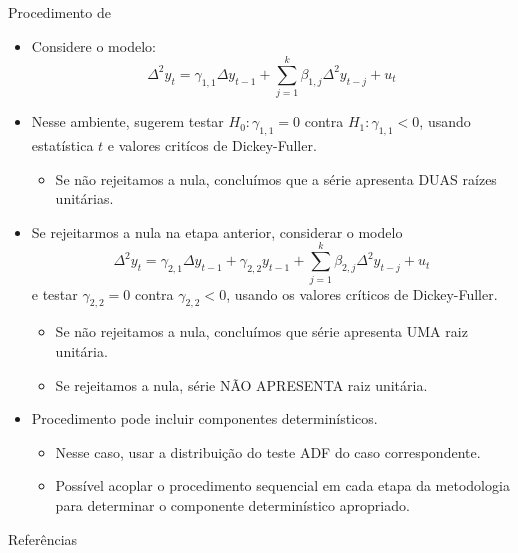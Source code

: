 \documentclass[11pt]{beamer}
\begin{document}
\begin{frame}{Procedimento de \citet{Dickey1987}}
	\begin{itemize}
		\small 
		\item Considere o modelo:
						\vspace{-0.5em}
		\begin{equation*}
			\Delta^2 y_t = \gamma_{1,1} \Delta y_{t-1} + \sum_{j=1}^{k} \beta_{1,j} \Delta^2 y_{t-j} + u_t
		\end{equation*}
		\item Nesse ambiente, \citet{Dickey1987} sugerem testar $H_0: \gamma_{1,1} = 0 $ contra $H_1: \gamma_{1,1} < 0$, usando estatística $t$ e valores critícos de Dickey-Fuller.
			\begin{itemize}
				\item Se não rejeitamos a nula, concluímos que a série apresenta DUAS raízes unitárias.
			\end{itemize}
		\item Se rejeitarmos a nula na etapa anterior, considerar o modelo
		\vspace{-0.5em}
				\begin{equation*}
			\Delta^2 y_t =\gamma_{2,1} \Delta y_{t-1} + \gamma_{2,2} y_{t-1} +  \sum_{j=1}^{k} \beta_{2,j} \Delta^2 y_{t-j} +  u_t
		\end{equation*}
		e testar $\gamma_{2,2}=0$ contra $\gamma_{2,2} < 0$, usando os valores críticos de Dickey-Fuller.
		\vspace{-1em}
		\begin{itemize}
			\item Se não rejeitamos a nula, concluímos que série apresenta UMA raiz unitária.
			\item Se rejeitamos a nula, série NÃO APRESENTA raiz unitária.
		\end{itemize}
		\item Procedimento pode incluir componentes determinísticos.
		\begin{itemize}
			\item Nesse caso, usar a distribuição do teste ADF do caso correspondente.
			\item Possível acoplar o procedimento sequencial em cada etapa da metodologia para determinar o componente determinístico apropriado.
		\end{itemize}
	\end{itemize}
\end{frame}


\begin{frame}[allowframebreaks]{Referências}
	\printbibliography
\end{frame}
\end{document}
